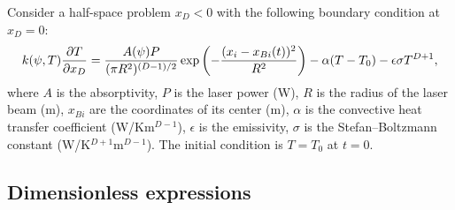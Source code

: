 \documentclass{article}
\begin{document}
Consider a half-space problem \(x_D<0\) with the following boundary condition at \(x_D=0\):
\begin{equation}\label{eq:bc}
	k(\psi,T)\pdv{T}{x_D} = \frac{A(\psi)P}{(\pi R^2)^{(D-1)/2}}\exp\qty( -\frac{(x_i-x_{Bi}(t))^2}{R^2} )
	    - \alpha(T-T_0) - \epsilon\sigma T^{D+1},
\end{equation}
where \(A\) is the absorptivity, \(P\) is the laser power (\si{W}), \(R\) is the radius of the laser beam (\si{m}),
\(x_{Bi}\) are the coordinates of its center (\si{m}), \(\alpha\) is the convective heat transfer coefficient (\si{W/Km}\(^{D-1}\)),
\(\epsilon\) is the emissivity, \(\sigma\) is the Stefan--Boltzmann constant (\si{W/K}\(^{D+1}\)\si{m}\(^{D-1}\)).
The initial condition is \(T=T_0\) at \(t=0\).

\subsection{Dimensionless expressions}
\end{document}
